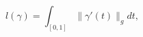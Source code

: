 \documentclass[preview]{standalone}
\begin{document}
\begin{center}
\[l(\gamma) = \int_{[0,1]} \lVert \gamma'(t)\rVert_g dt,\]
\end{center}
\end{document}
